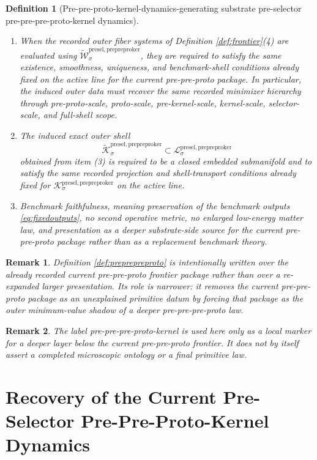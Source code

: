 \documentclass[11pt]{article}
\newcommand{\PrePreProtoKernelSpace}[1]{\mathcal I_{#1}^{\mathrm{presel,prepreproker}}}
\newcommand{\PrePreProtoKernelBody}[1]{\mathcal L_{#1}^{\mathrm{presel,prepreproker}}}
\newcommand{\PrePreProtoKernelShell}[1]{\mathcal K_{#1}^{\mathrm{presel,prepreproker}}}
\newcommand{\PrePrePreProtoKernelFiber}[2]{\mathcal Y_{#1}^{\mathrm{presel,preprepreproker}}(#2)}
\newcommand{\PrePrePreProtoKernelFunctional}[1]{\mathscr X_{#1}^{\mathrm{presel,preprepreproker}}}
\newcommand{\InducedPrePreProtoKernelFunctional}[1]{\widetilde{\mathscr W}_{#1}^{\mathrm{presel,prepreproker}}}
\newcommand{\InducedPrePreProtoKernelShell}[1]{\widetilde{\mathcal K}_{#1}^{\mathrm{presel,prepreproker}}}
\newtheorem{definition}{Definition}
\newtheorem{remark}{Remark}
\begin{document}
\begin{definition}[Pre-pre-proto-kernel-dynamics-generating substrate pre-selector pre-pre-pre-proto-kernel dynamics]
\begin{enumerate}
\[    =
    \min_{s\in\PrePrePreProtoKernelFiber{\sigma}{r}}
    \PrePrePreProtoKernelFunctional{\sigma}(s).
    \]
    It is required to extend smoothly to \(\PrePreProtoKernelSpace{\sigma}\).
    \item When the recorded outer fiber systems of Definition \ref{def:frontier}(4) are evaluated using \(\InducedPrePreProtoKernelFunctional{\sigma}\), they are required to satisfy the same existence, smoothness, uniqueness, and benchmark-shell conditions already fixed on the active line for the current pre-pre-proto package. In particular, the induced outer data must recover the same recorded minimizer hierarchy through pre-proto-scale, proto-scale, pre-kernel-scale, kernel-scale, selector-scale, and full-shell scope.
    \item The induced exact outer shell
    \[
    \InducedPrePreProtoKernelShell{\sigma}\subset\PrePreProtoKernelBody{\sigma}
    \]
    obtained from item (3) is required to be a closed embedded submanifold and to satisfy the same recorded projection and shell-transport conditions already fixed for \(\PrePreProtoKernelShell{\sigma}\) on the active line.
    \item Benchmark faithfulness, meaning preservation of the benchmark outputs \eqref{eq:fixedoutputs}, no second operative metric, no enlarged low-energy matter law, and presentation as a deeper substrate-side source for the current pre-pre-proto package rather than as a replacement benchmark theory.
\end{enumerate}
\end{definition}

\begin{remark}
Definition \ref{def:preprepreproto} is intentionally written over the already recorded current pre-pre-proto frontier package rather than over a re-expanded larger presentation. Its role is narrower: it removes the current pre-pre-proto package as an unexplained primitive datum by forcing that package as the outer minimum-value shadow of a deeper pre-pre-pre-proto law.
\end{remark}

\begin{remark}
The label \emph{pre-pre-pre-proto-kernel} is used here only as a local marker for a deeper layer below the current pre-pre-proto frontier. It does not by itself assert a completed microscopic ontology or a final primitive law.
\end{remark}

\section{Recovery of the Current Pre-Selector Pre-Pre-Proto-Kernel Dynamics}
\end{document}
